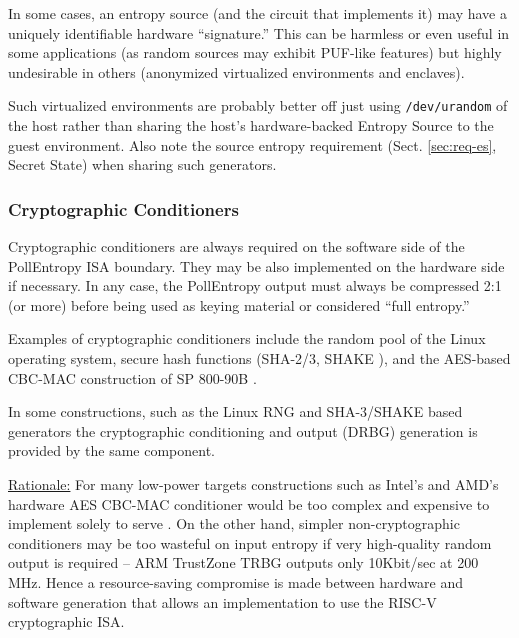     In some cases, an entropy source (and the circuit that implements it)
    may have a uniquely identifiable hardware ``signature.'' This can be
    harmless or even useful in some applications (as random sources may
    exhibit PUF-like features) but highly undesirable in others (anonymized
    virtualized environments and enclaves).

    Such virtualized environments are probably better off just using
    \verb|/dev/urandom| of the host rather than sharing the host's
    hardware-backed Entropy Source to the guest environment. Also note the
    source entropy requirement (Sect. \ref{sec:req-es}, Secret State)
    when sharing such generators.

\subsubsection{Cryptographic Conditioners}
\label{sec:crypto-cond}

    Cryptographic conditioners are always required on the software side of
    the PollEntropy ISA boundary. They may be also implemented on the
    hardware side if necessary. In any case, the PollEntropy output must
    always be compressed 2:1 (or more) before being used as keying material
    or considered ``full entropy.''

    Examples of cryptographic conditioners include the random pool
    of the Linux operating system, secure hash functions (SHA-2/3,
    SHAKE \cite{NI15,NI15A} ),
    and the AES-based CBC-MAC construction of SP 800-90B \cite{TuBaKe+18}.

    In some constructions, such as the Linux RNG and SHA-3/SHAKE \cite{NI15}
    based generators the cryptographic conditioning and output (DRBG)
    generation is provided by the same component.

    \underline{Rationale:}
    For many low-power targets constructions such as Intel's
    \cite{Me18} and AMD's \cite{AM17} hardware AES CBC-MAC conditioner
    would be too complex and expensive to implement solely to serve
    . On the other hand, simpler non-cryptographic
    conditioners may be too wasteful on input entropy if very high-quality
    random output is required -- ARM TrustZone TRBG \cite{AR17} outputs
    only 10Kbit/sec at 200 MHz. Hence a resource-saving compromise is
    made between hardware and software generation that allows an
    implementation to use the RISC-V cryptographic ISA.



